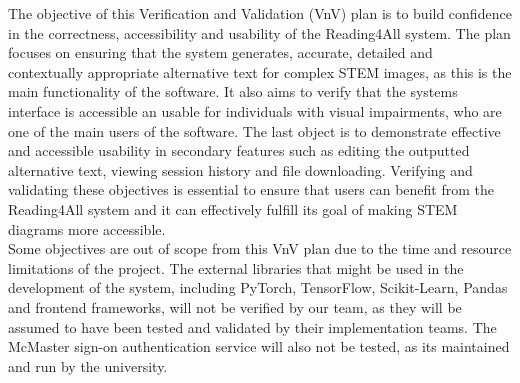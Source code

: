 \documentclass[12pt, titlepage]{article}
\begin{document}





The objective of this Verification and Validation (VnV) plan is to build confidence in the correctness, accessibility and usability of the Reading4All system. 
The plan focuses on ensuring that the system generates, accurate, detailed and contextually appropriate alternative text for complex STEM images, as this is the main functionality of the software. 
It also aims to verify that the systems interface is accessible an usable for individuals with visual impairments, who are one of the main users of the software. The last object is to demonstrate effective and accessible usability in secondary features
such as editing the outputted alternative text, viewing session history and file downloading. 
Verifying and validating these objectives is essential to ensure that users can benefit from the Reading4All system and 
it can effectively fulfill its goal of making STEM diagrams more accessible.
\\

Some objectives are out of scope from this VnV plan due to the time and resource limitations of the project.
The external libraries that might be used in the development of the system, including PyTorch, TensorFlow, Scikit-Learn, Pandas and frontend frameworks, will not be verified by our team, as they will be assumed to have been tested and validated by their implementation teams. 
The McMaster sign-on authentication service will also not be tested, as its maintained and run by the university.
\end{document}
